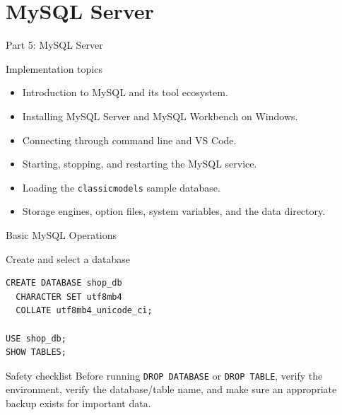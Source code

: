 \documentclass[aspectratio=169,11pt]{beamer}
\begin{document}
\section{MySQL Server}
\begin{frame}{Part 5: MySQL Server}
\begin{block}{Implementation topics}
\begin{itemize}
  \item Introduction to MySQL and its tool ecosystem.
  \item Installing MySQL Server and MySQL Workbench on Windows.
  \item Connecting through command line and VS Code.
  \item Starting, stopping, and restarting the MySQL service.
  \item Loading the \texttt{classicmodels} sample database.
  \item Storage engines, option files, system variables, and the data directory.
\end{itemize}
\end{block}
\end{frame}

\begin{frame}[fragile]{Basic MySQL Operations}
\begin{block}{Create and select a database}
\begin{verbatim}
CREATE DATABASE shop_db
  CHARACTER SET utf8mb4
  COLLATE utf8mb4_unicode_ci;

USE shop_db;
SHOW TABLES;
\end{verbatim}
\end{block}

\begin{alertblock}{Safety checklist}
Before running \texttt{DROP DATABASE} or \texttt{DROP TABLE}, verify the environment, verify the database/table name, and make sure an appropriate backup exists for important data.
\end{alertblock}
\end{frame}

\end{document}
